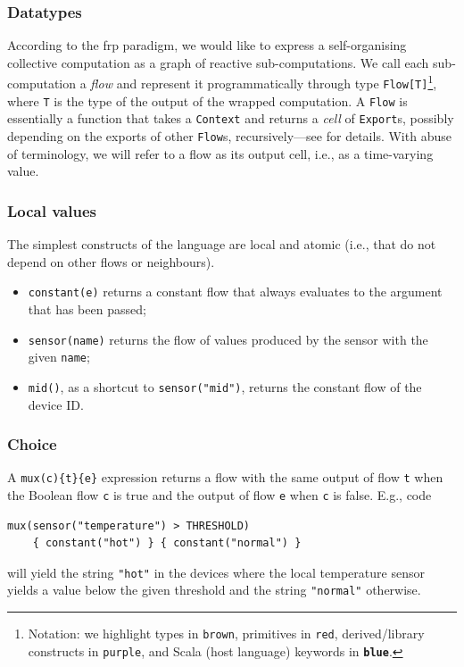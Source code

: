 \subsubsection{Datatypes}
%
According to the \ac{frp} paradigm,
 we would like to express
 a self-organising collective computation
 as a graph of reactive sub-computations.
%
We call each sub-computation a \emph{flow}
 and represent it programmatically through type \lstinline|Flow[T]|\footnote{Notation: we highlight types in {\color{brown!50!black}\texttt{brown}}, primitives in {\color{red}\texttt{red}}, derived/library constructs in {\color{purple}\texttt{purple}}, and Scala (host language) keywords in {\color{blue}\textbf{\texttt{blue}}}.}, where \lstinline|T| is the type of the output of the wrapped computation.
%
A \lstinline|Flow| is essentially a function that takes %
a \lstinline|Context| and returns a \emph{cell} of \lstinline|Export|s, possibly depending on the exports of other \lstinline|Flow|s, recursively---see  for details.
%
With abuse of terminology,
 we will refer to a flow 
 as its output cell, i.e., as a time-varying value.

\subsubsection{Local values}
%
The simplest constructs of the language are local and atomic 
(i.e., that do not depend on other flows or neighbours).
%
\begin{itemize}
    \item \lstinline|constant(e)| returns a constant flow that always evaluates to the argument that has been passed;
    \item \lstinline|sensor(name)| returns the flow of values produced by the sensor with the given \texttt{name};
    \item \lstinline|mid()|, as a shortcut to \lstinline|sensor("mid")|, returns the constant flow of the device ID. %
\end{itemize}


\subsubsection{Choice}
%
A \lstinline|mux(c){t}{e}| expression
 returns a flow with the same output of flow \texttt{t} when the Boolean flow \texttt{c} is true and the output of flow \texttt{e} when \texttt{c} is false.
%
E.g., code 
\begin{lstlisting}
mux(sensor("temperature") > THRESHOLD)
    { constant("hot") } { constant("normal") }
\end{lstlisting}
will yield the string \lstinline|"hot"|
in the devices where the local temperature sensor yields a value below the given threshold
and the string \lstinline|"normal"| otherwise.

